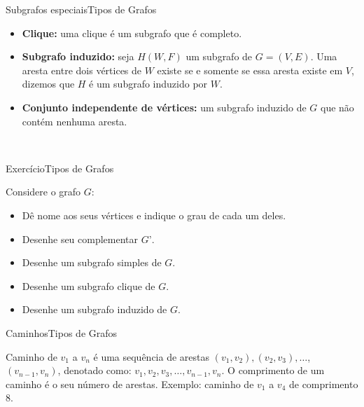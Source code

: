 \documentclass[t]{beamer}
\begin{document}

\begin{ftst}{Subgrafos especiais}{Tipos de Grafos}

\begin{itemize}
    \item \textbf{Clique:} uma clique é um subgrafo que é completo.
    \item \textbf{Subgrafo induzido:} seja $H(W,F)$ um subgrafo de $G = (V,E)$. Uma aresta entre dois vértices de $W$ existe se e somente se essa aresta existe em $V$, dizemos que $H$ é um subgrafo induzido por $W$.
    \item \textbf{Conjunto independente de vértices:} um subgrafo induzido de $G$ que não contém nenhuma aresta.
\end{itemize}

\centering
\\

\end{ftst}


\begin{ftst}{Exercício}{Tipos de Grafos}

Considere o grafo $G$:
\vone
\centering
\\
\vone
\begin{itemize}
    \item Dê nome aos seus vértices e indique o grau de cada um deles.
    \item Desenhe seu complementar $G’$.
    \item Desenhe um subgrafo simples de $G$.
    \item Desenhe um subgrafo clique de $G$.
    \item Desenhe um subgrafo induzido de $G$.
\end{itemize}

\end{ftst}



\begin{ftst}{Caminhos}{Tipos de Grafos}

Caminho de $v_1$ a $v_n$ é uma sequência de arestas $(v_1,v_2),(v_2,v_3), \dots$, $(v_{n-1}, v_n)$, denotado como: $v_1, v_2, v_3, \dots, v_{n-1}, v_n$. 
\vone
O comprimento de um caminho é o seu número de arestas.
\vone
Exemplo: caminho de $v_1$ a $v_4$ de comprimento 8.

\centering
\\


\end{ftst}
\end{document}
